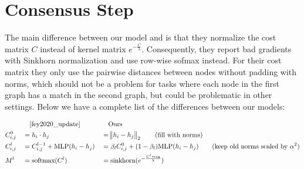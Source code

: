 \section{Consensus Step}
\label{appendix:consensus}

The main difference between our model and \cite{fey2020_update} is that they normalize the cost matrix $C$ instead of kernel matrix $e^{-\frac{C}{\lambda}}$. Consequently, they report bad gradients with Sinkhorn normalization and use row-wise sofmax instead. For their cost matrix they only use the pairwise distances between nodes without padding with norms, which should not be a problem for tasks where each node in the first graph has a match in the second graph, but could be problematic in other settings. Below we have a complete list of the differences between our models:

\begin{alignat*}{3}
     & && \quad \text{\cite{fey2020_update}} && \quad \text{Ours} \\
     &C^0_{i,j} &&= h_i \cdot h_j &&= \norm{h_i - h_j}_2 \qquad \text{(fill with norms)} \\
     &C^l_{i,j} &&= C^{l - 1}_{i,j} + \text{MLP}(h_i - h_j) &&= \beta_l C^0_{i,j} + (1 - \beta_l) \text{MLP}(h_i - h_j) \qquad \text{(keep old norms scaled by } \alpha^2 \text{)} \\
     &M^l &&= \text{softmax}(C^l) &&= \text{sinkhorn}(e^{-\frac{C^l * \text{reg}}{\lambda}}) \\
\end{alignat*}






